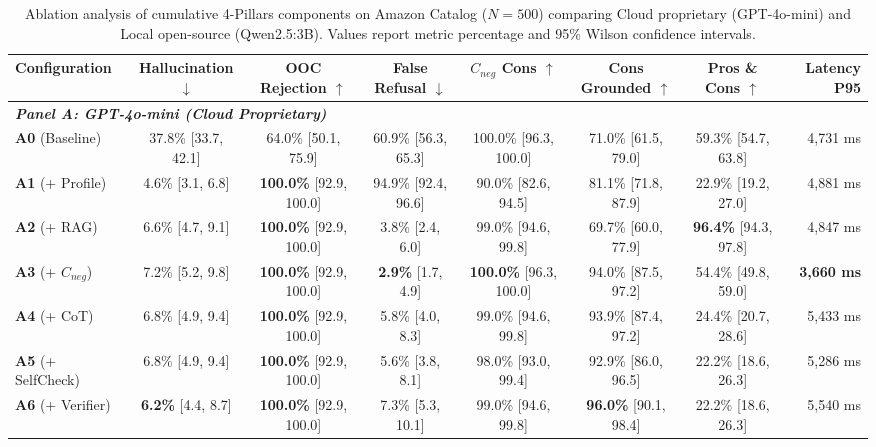 
\begin{table}[t]
\centering
\caption{Ablation analysis of cumulative 4-Pillars components on Amazon Catalog ($N=500$) comparing Cloud proprietary (GPT-4o-mini) and Local open-source (Qwen2.5:3B). Values report metric percentage and 95\% Wilson confidence intervals.}
\label{tab:ablation_study_combined}
\small
\begin{tabular}{lccccccr}
\toprule
\textbf{Configuration} & \textbf{Hallucination $\downarrow$} & \textbf{OOC Rejection $\uparrow$} & \textbf{False Refusal $\downarrow$} & \textbf{$C_{neg}$ Cons $\uparrow$} & \textbf{Cons Grounded $\uparrow$} & \textbf{Pros \& Cons $\uparrow$} & \textbf{Latency P95} \\
\midrule
\multicolumn{8}{l}{\textit{\textbf{Panel A: GPT-4o-mini (Cloud Proprietary)}}} \\
\textbf{A0} (Baseline) & 37.8\% [33.7, 42.1] & 64.0\% [50.1, 75.9] & 60.9\% [56.3, 65.3] & 100.0\% [96.3, 100.0] & 71.0\% [61.5, 79.0] & 59.3\% [54.7, 63.8] & 4,731 ms \\
\textbf{A1} (+ Profile) & 4.6\% [3.1, 6.8] & \textbf{100.0\%} [92.9, 100.0] & 94.9\% [92.4, 96.6] & 90.0\% [82.6, 94.5] & 81.1\% [71.8, 87.9] & 22.9\% [19.2, 27.0] & 4,881 ms \\
\textbf{A2} (+ RAG) & 6.6\% [4.7, 9.1] & \textbf{100.0\%} [92.9, 100.0] & 3.8\% [2.4, 6.0] & 99.0\% [94.6, 99.8] & 69.7\% [60.0, 77.9] & \textbf{96.4\%} [94.3, 97.8] & 4,847 ms \\
\textbf{A3} (+ $C_{neg}$) & 7.2\% [5.2, 9.8] & \textbf{100.0\%} [92.9, 100.0] & \textbf{2.9\%} [1.7, 4.9] & \textbf{100.0\%} [96.3, 100.0] & 94.0\% [87.5, 97.2] & 54.4\% [49.8, 59.0] & \textbf{3,660 ms} \\
\textbf{A4} (+ CoT) & 6.8\% [4.9, 9.4] & \textbf{100.0\%} [92.9, 100.0] & 5.8\% [4.0, 8.3] & 99.0\% [94.6, 99.8] & 93.9\% [87.4, 97.2] & 24.4\% [20.7, 28.6] & 5,433 ms \\
\textbf{A5} (+ SelfCheck) & 6.8\% [4.9, 9.4] & \textbf{100.0\%} [92.9, 100.0] & 5.6\% [3.8, 8.1] & 98.0\% [93.0, 99.4] & 92.9\% [86.0, 96.5] & 22.2\% [18.6, 26.3] & 5,286 ms \\
\textbf{A6} (+ Verifier) & \textbf{6.2\%} [4.4, 8.7] & \textbf{100.0\%} [92.9, 100.0] & 7.3\% [5.3, 10.1] & 99.0\% [94.6, 99.8] & \textbf{96.0\%} [90.1, 98.4] & 22.2\% [18.6, 26.3] & 5,540 ms \\

\end{tabular}
\end{table}
